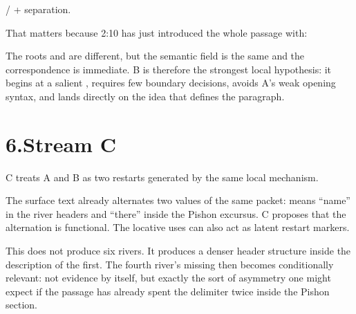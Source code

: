 \begin{center}
/ \quad + \quad separation.
\end{center}

That matters because 2:10 has just introduced the whole passage with:


The roots  and  are different, but the semantic field is the same and the correspondence is immediate. B is therefore the strongest local hypothesis: it begins at a salient , requires few boundary decisions, avoids A's weak opening syntax, and lands directly on the idea that defines the paragraph.

\section*{6.\quad Stream C}

C treats A and B as two restarts generated by the same local mechanism.


The surface text already alternates two values of the same packet:  means ``name'' in the river headers and ``there'' inside the Pishon excursus. C proposes that the alternation is functional. The locative uses can also act as latent restart markers.

This does not produce six rivers. It produces a denser header structure inside the description of the first. The fourth river's missing  then becomes conditionally relevant: not evidence by itself, but exactly the sort of asymmetry one might expect if the passage has already spent the delimiter twice inside the Pishon section.

